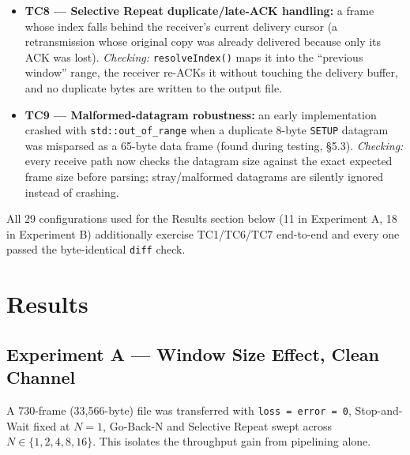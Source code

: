 \documentclass[11pt]{article}
\begin{document}
\begin{itemize}[leftmargin=1.6em]
  \item \textbf{TC8 --- Selective Repeat duplicate/late-ACK handling:} a frame whose index
  falls behind the receiver's current delivery cursor (a retransmission whose original copy
  was already delivered because only its ACK was lost). \emph{Checking:}
  \texttt{resolveIndex()} maps it into the ``previous window'' range, the receiver re-ACKs
  it without touching the delivery buffer, and no duplicate bytes are written to the output
  file.
  \item \textbf{TC9 --- Malformed-datagram robustness:} an early implementation crashed
  with \texttt{std::out\_of\_range} when a duplicate 8-byte \texttt{SETUP} datagram was
  misparsed as a 65-byte data frame (found during testing, \S5.3). \emph{Checking:} every
  receive path now checks the datagram size against the exact expected frame size before
  parsing; stray/malformed datagrams are silently ignored instead of crashing.
\end{itemize}

All 29 configurations used for the Results section below (11 in Experiment A, 18 in
Experiment B) additionally exercise TC1/TC6/TC7 end-to-end and every one passed the
byte-identical \texttt{diff} check.

\section{Results}

\subsection{Experiment A --- Window Size Effect, Clean Channel}
A 730-frame (33{,}566-byte) file was transferred with \texttt{loss = error = 0},
Stop-and-Wait fixed at $N=1$, Go-Back-N and Selective Repeat swept across
$N \in \{1,2,4,8,16\}$. This isolates the throughput gain from pipelining alone.
\end{document}
